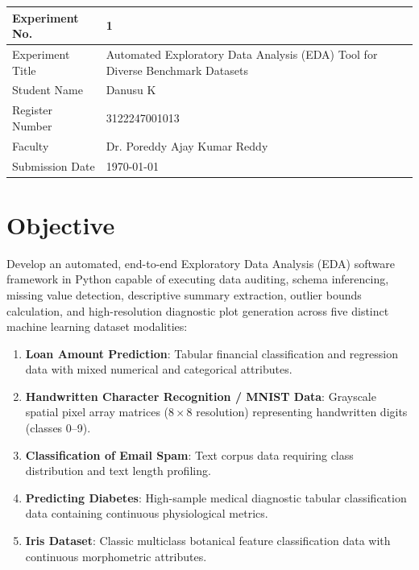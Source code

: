 \documentclass[12pt,a4paper]{article}
\begin{document}
\begin{tabular}{|p{4cm}|p{11cm}|}
\hline
Experiment No. & 1 \\ \hline
Experiment Title & Automated Exploratory Data Analysis (EDA) Tool for Diverse Benchmark Datasets\footnotemark \\ \hline
Student Name & Danusu K \\ \hline
Register Number & 3122247001013 \\ \hline
Faculty & Dr. Poreddy Ajay Kumar Reddy \\ \hline
Submission Date & \today \\ \hline
\end{tabular}

\section{Objective}
Develop an automated, end-to-end Exploratory Data Analysis (EDA) software framework in Python capable of executing data auditing, schema inferencing, missing value detection, descriptive summary extraction, outlier bounds calculation, and high-resolution diagnostic plot generation across five distinct machine learning dataset modalities:
\begin{enumerate}[label={(\roman*)}]
\item \textbf{Loan Amount Prediction}: Tabular financial classification and regression data with mixed numerical and categorical attributes.
\item \textbf{Handwritten Character Recognition / MNIST Data}: Grayscale spatial pixel array matrices ($8 \times 8$ resolution) representing handwritten digits (classes 0--9).
\item \textbf{Classification of Email Spam}: Text corpus data requiring class distribution and text length profiling.
\item \textbf{Predicting Diabetes}: High-sample medical diagnostic tabular classification data containing continuous physiological metrics.
\item \textbf{Iris Dataset}: Classic multiclass botanical feature classification data with continuous morphometric attributes.
\end{enumerate}
\end{document}
